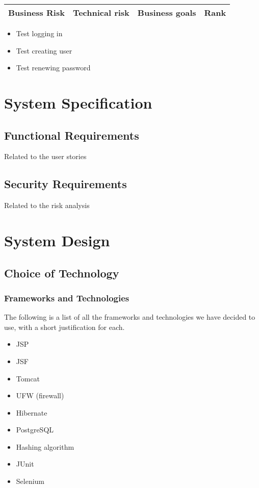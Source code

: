 \documentclass[a4paper]{article}
\begin{document}
\begin{table}
	\begin{tabular}{| l | l | l | l |}
   	\textbf{Business Risk} & \textbf{Technical risk} & \textbf{Business goals} & \textbf{Rank} \\ \hline
    
    \end{tabular}
\end{table}

\begin{itemize}
\item Test logging in
\item Test creating user
\item Test renewing password
\end{itemize}

\section{System Specification}

\subsection{Functional Requirements}
Related to the user stories

\subsection{Security Requirements}
Related to the risk analysis

\section{System Design}

\subsection{Choice of Technology}
\subsubsection{Frameworks and Technologies}
The following is a list of all the frameworks and technologies we have decided to use, with a short justification for each.
\begin{itemize}
\item JSP
\item JSF
\item Tomcat
\item UFW (firewall)
\item Hibernate
\item PostgreSQL
\item Hashing algorithm
\item JUnit
\item Selenium
\end{itemize}
\end{document}
